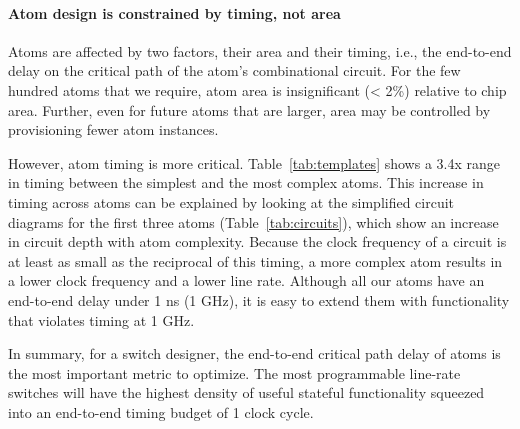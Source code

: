 \paragraph{Atom design is constrained by timing, not area}

Atoms are affected by two factors, their area and their timing, i.e., the
end-to-end delay on the critical path of the atom's combinational circuit. For
the few hundred atoms that we require, atom area is insignificant (< 2\%)
relative to chip area. Further, even for future atoms that are larger, area may
be controlled by provisioning fewer atom instances.

However, atom timing is more critical. Table~\ref{tab:templates} shows a 3.4x
range in timing between the simplest and the most complex atoms. This increase
in timing across atoms can be explained by looking at the simplified circuit
diagrams for the first three atoms (Table~\ref{tab:circuits}), which show an
increase in circuit depth with atom complexity. Because the clock frequency of
a circuit is at least as small as the reciprocal of this timing, a more complex
atom results in a lower clock frequency and a lower line rate. Although all our
atoms have an end-to-end delay under  1 ns (1 GHz), it is easy to extend them
with functionality that violates timing at 1 GHz.

In summary, for a switch designer, the end-to-end critical path delay of atoms
is the most important metric to optimize. The most programmable line-rate
switches will have the highest density of useful stateful functionality
squeezed into an end-to-end timing budget of 1 clock cycle.

